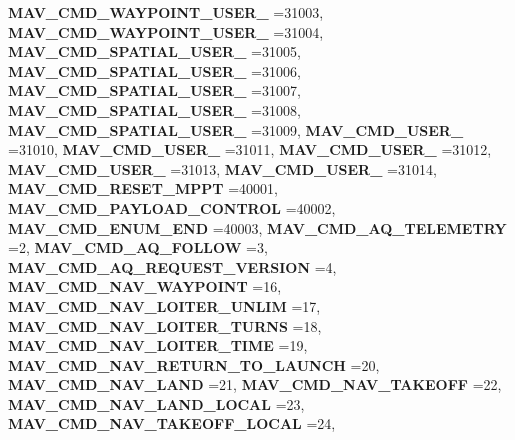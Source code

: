 \begin{DoxyCompactItemize}
\textbf{ M\+A\+V\+\_\+\+C\+M\+D\+\_\+\+W\+A\+Y\+P\+O\+I\+N\+T\+\_\+\+U\+S\+E\+R\+\_} =31003, 
\textbf{ M\+A\+V\+\_\+\+C\+M\+D\+\_\+\+W\+A\+Y\+P\+O\+I\+N\+T\+\_\+\+U\+S\+E\+R\+\_} =31004, 
\newline
\textbf{ M\+A\+V\+\_\+\+C\+M\+D\+\_\+\+S\+P\+A\+T\+I\+A\+L\+\_\+\+U\+S\+E\+R\+\_} =31005, 
\textbf{ M\+A\+V\+\_\+\+C\+M\+D\+\_\+\+S\+P\+A\+T\+I\+A\+L\+\_\+\+U\+S\+E\+R\+\_} =31006, 
\textbf{ M\+A\+V\+\_\+\+C\+M\+D\+\_\+\+S\+P\+A\+T\+I\+A\+L\+\_\+\+U\+S\+E\+R\+\_} =31007, 
\textbf{ M\+A\+V\+\_\+\+C\+M\+D\+\_\+\+S\+P\+A\+T\+I\+A\+L\+\_\+\+U\+S\+E\+R\+\_} =31008, 
\newline
\textbf{ M\+A\+V\+\_\+\+C\+M\+D\+\_\+\+S\+P\+A\+T\+I\+A\+L\+\_\+\+U\+S\+E\+R\+\_} =31009, 
\textbf{ M\+A\+V\+\_\+\+C\+M\+D\+\_\+\+U\+S\+E\+R\+\_} =31010, 
\textbf{ M\+A\+V\+\_\+\+C\+M\+D\+\_\+\+U\+S\+E\+R\+\_} =31011, 
\textbf{ M\+A\+V\+\_\+\+C\+M\+D\+\_\+\+U\+S\+E\+R\+\_} =31012, 
\newline
\textbf{ M\+A\+V\+\_\+\+C\+M\+D\+\_\+\+U\+S\+E\+R\+\_} =31013, 
\textbf{ M\+A\+V\+\_\+\+C\+M\+D\+\_\+\+U\+S\+E\+R\+\_} =31014, 
\textbf{ M\+A\+V\+\_\+\+C\+M\+D\+\_\+\+R\+E\+S\+E\+T\+\_\+\+M\+P\+PT} =40001, 
\textbf{ M\+A\+V\+\_\+\+C\+M\+D\+\_\+\+P\+A\+Y\+L\+O\+A\+D\+\_\+\+C\+O\+N\+T\+R\+OL} =40002, 
\newline
\textbf{ M\+A\+V\+\_\+\+C\+M\+D\+\_\+\+E\+N\+U\+M\+\_\+\+E\+ND} =40003, 
\textbf{ M\+A\+V\+\_\+\+C\+M\+D\+\_\+\+A\+Q\+\_\+\+T\+E\+L\+E\+M\+E\+T\+RY} =2, 
\textbf{ M\+A\+V\+\_\+\+C\+M\+D\+\_\+\+A\+Q\+\_\+\+F\+O\+L\+L\+OW} =3, 
\textbf{ M\+A\+V\+\_\+\+C\+M\+D\+\_\+\+A\+Q\+\_\+\+R\+E\+Q\+U\+E\+S\+T\+\_\+\+V\+E\+R\+S\+I\+ON} =4, 
\newline
\textbf{ M\+A\+V\+\_\+\+C\+M\+D\+\_\+\+N\+A\+V\+\_\+\+W\+A\+Y\+P\+O\+I\+NT} =16, 
\textbf{ M\+A\+V\+\_\+\+C\+M\+D\+\_\+\+N\+A\+V\+\_\+\+L\+O\+I\+T\+E\+R\+\_\+\+U\+N\+L\+IM} =17, 
\textbf{ M\+A\+V\+\_\+\+C\+M\+D\+\_\+\+N\+A\+V\+\_\+\+L\+O\+I\+T\+E\+R\+\_\+\+T\+U\+R\+NS} =18, 
\textbf{ M\+A\+V\+\_\+\+C\+M\+D\+\_\+\+N\+A\+V\+\_\+\+L\+O\+I\+T\+E\+R\+\_\+\+T\+I\+ME} =19, 
\newline
\textbf{ M\+A\+V\+\_\+\+C\+M\+D\+\_\+\+N\+A\+V\+\_\+\+R\+E\+T\+U\+R\+N\+\_\+\+T\+O\+\_\+\+L\+A\+U\+N\+CH} =20, 
\textbf{ M\+A\+V\+\_\+\+C\+M\+D\+\_\+\+N\+A\+V\+\_\+\+L\+A\+ND} =21, 
\textbf{ M\+A\+V\+\_\+\+C\+M\+D\+\_\+\+N\+A\+V\+\_\+\+T\+A\+K\+E\+O\+FF} =22, 
\textbf{ M\+A\+V\+\_\+\+C\+M\+D\+\_\+\+N\+A\+V\+\_\+\+L\+A\+N\+D\+\_\+\+L\+O\+C\+AL} =23, 
\newline
\textbf{ M\+A\+V\+\_\+\+C\+M\+D\+\_\+\+N\+A\+V\+\_\+\+T\+A\+K\+E\+O\+F\+F\+\_\+\+L\+O\+C\+AL} =24, 

\end{DoxyCompactItemize}
